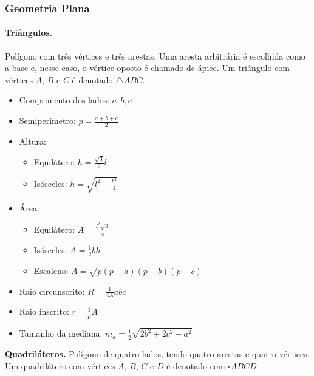 \subsubsection{Geometria Plana}

\paragraph{Triângulos.} Polígono com três vértices e três arestas. Uma aresta arbitrária é escolhida como a base e, nesse caso, o vértice oposto é chamado de ápice. Um triângulo com vértices $A$, $B$ e $C$ é denotado $\triangle ABC$.

\begin{multicols}{2}
	\begin{itemize}
		\item Comprimento dos lados: $a,b,c$
		\item Semiperímetro: $p = \frac{a+b+c}{2}$
		\item Altura:
		\begin{itemize}
			\item Equilátero: $h = \frac{\sqrt{3}}{2}l$
			\item Isósceles: $h = \sqrt{l^2 - \frac{b^2}{4}}$
		\end{itemize}
		\item Área:
		\begin{itemize}
			\item Equilátero: $A =\frac{l^2\sqrt{3}}{4}$
			\item Isósceles: $A =\frac{1}{2} bh$
			\item Escaleno: $A =\sqrt{p(p-a)(p-b)(p-c)}$
		\end{itemize}
		\item Raio circunscrito: $R = \frac{1}{4A}abc$
		\item Raio inscrito: $r = \frac{1}{p}A$
		\item Tamanho da mediana: $m_a = \frac{1}{2}\sqrt{2b^2+2c^2-a^2}$
	\end{itemize}
\end{multicols}

\noindent \textbf{Quadriláteros.} Polígono de quatro lados, tendo quatro arestas e quatro vértices. Um quadrilátero com vértices $A$, $B$, $C$ e $D$ é denotado com $\square ABCD$.

